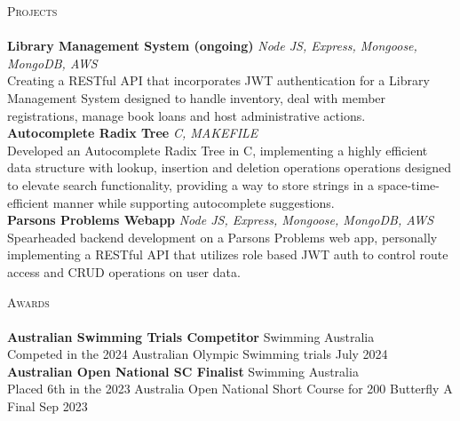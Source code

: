 \documentclass[a4paper]{article}
\newcommand{\lineunder} {
    \vspace*{-8pt} \\
    \hspace*{-18pt} \hrulefill \\
}
\newcommand{\header} [1] {
    {\hspace*{-18pt}\vspace*{6pt} \textsc{#1}}
    \vspace*{-6pt} \lineunder
}
\begin{document}
\header{Projects}
{\textbf{Library Management System (ongoing)}} {\sl Node JS, Express, Mongoose, MongoDB, AWS} 
\\
Creating a RESTful API that incorporates JWT authentication for a Library Management System designed to handle inventory, deal with member registrations, manage book loans and host administrative actions.\\
\vspace*{2mm}
{\textbf{Autocomplete Radix Tree}} {\sl C, MAKEFILE}
\\
Developed an Autocomplete Radix Tree in C, implementing a highly efficient data structure with lookup, insertion and deletion operations operations designed to elevate search functionality, providing a way to store strings in a space-time-efficient manner while supporting autocomplete suggestions.\\
\vspace*{2mm}
{\textbf{Parsons Problems Webapp}} {\sl Node JS, Express, Mongoose, MongoDB, AWS} \hfill 
\\
Spearheaded backend development on a Parsons Problems web app, personally implementing a RESTful API that utilizes role based JWT auth to control route access and CRUD operations on user data.\\
\vspace*{2mm}

\header{Awards}
\textbf{Australian Swimming Trials Competitor} \hfill Swimming Australia\\
Competed in the 2024 Australian Olympic Swimming trials \hfill July 2024\\
\vspace*{2mm}
\textbf{Australian Open National SC Finalist} \hfill Swimming Australia\\
Placed 6th in the 2023 Australia Open National Short Course for 200 Butterfly A Final \hfill Sep 2023\\
\vspace*{2mm}

\ 
\end{document}
